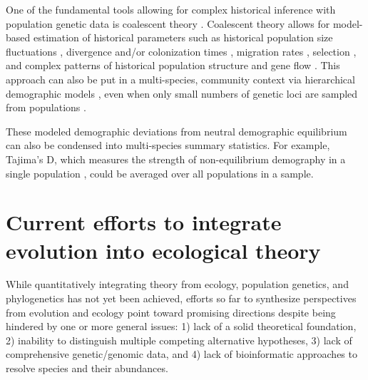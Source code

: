 \documentclass[12pt]{article}
\begin{document}
One of the fundamental tools allowing for complex historical inference
with population genetic data is coalescent theory
\citep{kingman1982stochasti, rosenberg2002}.  Coalescent theory allows
for model-based estimation of historical parameters such as historical
population size fluctuations \citep{kuhner1998}, divergence and/or
colonization times \citep{charlesworth2010, edwards2000}, migration
rates \citep{wakeley2008}, selection \citep{kern2016}, and complex
patterns of historical population structure \citep{prado-martinez2013}
and gene flow \citep{beerli2001, hey2004}. This approach can also be
put in a multi-species, community context via hierarchical demographic
models \citep{xue2015, hickerson2006, carstens2016, chan2014}, even
when only small numbers of genetic loci are sampled from populations
\citep{drummond2005}.

These modeled demographic deviations from neutral demographic
equilibrium can also be condensed into multi-species summary
statistics. For example, Tajima's D, which measures the strength of
non-equilibrium demography in a single population \citep[see Glossary
for more details;][]{tajima1989, jensen2005, schrider2016,
  stephan2016}, could be averaged over all populations in a sample.


\section{Current efforts to integrate evolution into ecological theory} \label{sec:toDate}

While quantitatively integrating theory from ecology, population
genetics, and phylogenetics has not yet been achieved, efforts so far
to synthesize perspectives from evolution and ecology point toward
promising directions despite being
hindered by one or more general issues: 1) lack of a solid theoretical
foundation, 2) inability to distinguish multiple competing alternative
hypotheses, 3) lack of comprehensive genetic/genomic data, and 4) lack of
bioinformatic approaches to resolve species and their abundances.
\end{document}
